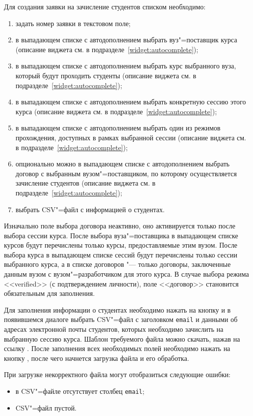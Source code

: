 Для создания заявки на зачисление студентов списком необходимо:
\begin{enumerate}
	\item задать номер заявки в текстовом поле;
	\item в выпадающем списке с автодополнением выбрать вуз"=поставщик курса
	(описание виджета см. в подразделе~\ref{widget:autocomplete});
	\item в выпадающем списке с автодополнением выбрать курс выбранного вуза, который будут проходить студенты 
	(описание виджета см. в подразделе~\ref{widget:autocomplete});
	\item в выпадающем списке с автодополнением выбрать конкретную сессию этого курса 
	(описание виджета см. в подразделе~\ref{widget:autocomplete});
	\item в выпадающем списке с автодополнением выбрать один из режимов прохождения, доступных в рамках выбранной сессии 
	(описание виджета см. в подразделе~\ref{widget:autocomplete});
	\item опционально можно в выпадающем списке с автодополнением выбрать договор с выбранным вузом"=поставщиком, 
	по которому осуществляется зачисление студентов (описание виджета см. в подразделе~\ref{widget:autocomplete});
	\item выбрать CSV"=файл с информацией о студентах. 
\end{enumerate}


Изначально поле выбора договора неактивно, оно активируется только после выбора сессии курса.
После выбора вуза"=поставщика в выпадающем списке курсов будут перечислены только курсы, предоставляемые этим вузом.
После выбора курса в выпадающем списке сессий будут перечислены только сессии выбранного курса, 
а в списке договоров "--- только договоры, заключенные данным вузом с вузом"=разработчиком для этого курса.
В случае выбора режима <<verified>> (с подтверждением личности), поле <<договор>> становится обязательным для заполнения. 

Для заполнения информации о студентах необходимо нажать на кнопку  и в появившемся диалоге выбрать CSV"=файл 
с заголовком {\tt email} и данными об адресах электронной почты студентов, которых необходимо зачислить на выбранную сессию курса. 
Шаблон требуемого файла можно скачать, нажав на ссылку .
После заполнения всех необходимых полей необходимо нажать на кнопку , 
после чего начнется загрузка файла и его обработка. 


При загрузке некорректного файла могут отобразиться следующие ошибки:
\begin{itemize}
	\item в CSV"=файле отсутствует столбец {\tt email};
	\item CSV"=файл пустой.
\end{itemize} 

